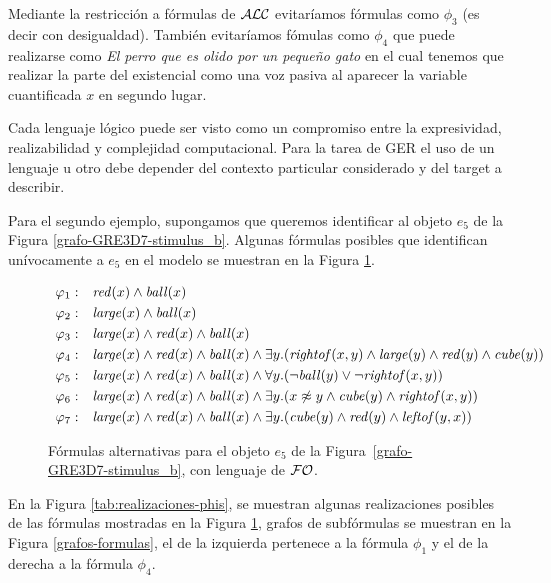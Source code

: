  Mediante la restricci\'on a f\'ormulas de $\mathcal{ALC}$ 
evitar\'iamos f\'ormulas como $\phi_3$ (es decir con desigualdad). Tambi\'en evitar\'iamos f\'omulas como $\phi_4$ que puede realizarse como {\it El perro que es olido por un peque\~no gato} en el cual tenemos que realizar la parte del existencial como una voz pasiva al aparecer la variable cuantificada $x$ en segundo lugar.

Cada lenguaje l\'ogico puede ser visto como un compromiso entre la expresividad, realizabilidad y complejidad computacional. Para la tarea de GER el uso de un lenguaje u otro debe depender del contexto particular considerado y del target a describir.

Para el segundo ejemplo, supongamos que queremos identificar al objeto $e_5$ de la Figura \ref{grafo-GRE3D7-stimulus_b}. Algunas f\'ormulas posibles
 que identifican un\'ivocamente a $e_5$ en el modelo se muestran en la Figura \ref{tab:phis}.

\begin{figure}[H]
$$
\begin{array}{ll}
 \varphi_1: & \mathit{red}(x) \land \mathit{ball}(x)\\[3pt]
 \varphi_2: & \mathit{large}(x) \land \mathit{ball}(x)\\[3pt]
 \varphi_3: & \mathit{large}(x) \land \mathit{red}(x) \land \mathit{ball}(x)\\[3pt]
 \varphi_4: & \mathit{large}(x) \land \mathit{red}(x) \land \mathit{ball}(x) \land
   \exists y . (\mathit{rightof}(x,y) \land \mathit{large}(y) \land \mathit{red}(y) \land \mathit{cube}(y))\\[3pt]
 \varphi_5: & \mathit{large}(x) \land \mathit{red}(x) \land \mathit{ball}(x) \land
  \forall y . (\neg \mathit{ball}(y) \lor \neg \mathit{rightof}(x,y))\\[3pt]
 \varphi_6: & \mathit{large}(x) \land \mathit{red}(x) \land \mathit{ball}(x) \land
  \exists y . (x \not\approx y \land \mathit{cube}(y) \land \mathit{rightof}(x,y))\\[3pt]
 \varphi_7: & \mathit{large}(x) \land \mathit{red}(x) \land \mathit{ball}(x) \land
  \exists y . (\mathit{cube}(y) \land \mathit{red}(y) \land \mathit{leftof}(y,x))
 \end{array}
$$
\caption{F\'ormulas alternativas para el objeto $e_5$ de la Figura~\protect\ref{grafo-GRE3D7-stimulus_b}, con lenguaje de $\mathcal{FO}$.}\label{tab:phis}
\end{figure}

En la Figura \ref{tab:realizaciones-phis}, se muestran algunas realizaciones posibles de las f\'ormulas mostradas en la Figura \ref{tab:phis}, grafos de subf\'ormulas se muestran en la Figura \ref{grafos-formulas}, el de la izquierda pertenece a la f\'ormula $\phi_1$ y el de la derecha a la f\'ormula $\phi_4$.

